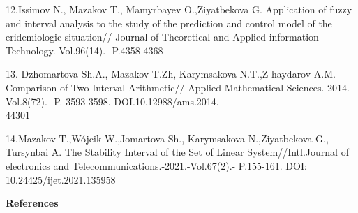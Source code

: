 \begin{noparindent}
12.Issimov N., Mazakov T., Mamyrbayev O.,Ziyatbekova G. Application of
fuzzy and interval analysis to the study of the prediction and control
model of the eridemiologic situation// Journal of Theoretical and
Applied information Technology.-Vol.96(14).- P.4358-4368

13. Dzhomartova Sh.A., Mazakov T.Zh, Karymsakova N.T.,Z haydarov A.M.
Comparison of Two Interval Arithmetic// Applied Mathematical
Sciences.-2014.-Vol.8(72).- P.-3593-3598. DOI.10.12988/ams.2014.\\44301

14.Mazakov T.,Wójcik W.,Jomartova Sh., Karymsakova N.,Ziyatbekova G.,
Tursynbai A. The Stability Interval of the Set of Linear
System//Intl.Journal of electronics and
Telecommunications.-2021.-Vol.67(2).- P.155-161. DOI:
10.24425/ijet.2021.135958
\end{noparindent}
 
\begin{center}
  {\bfseries References}
  \end{center}



